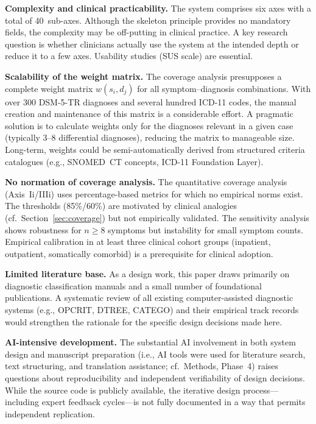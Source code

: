 \documentclass[11pt,a4paper]{article}
\begin{document}
\textbf{Complexity and clinical practicability.} The system comprises six axes with a total of 40~sub-axes. Although the skeleton principle provides no mandatory fields, the complexity may be off-putting in clinical practice. A key research question is whether clinicians actually use the system at the intended depth or reduce it to a few axes. Usability studies (SUS scale) are essential.

\textbf{Scalability of the weight matrix.} The coverage analysis presupposes a complete weight matrix $w(s_i, d_j)$ for all symptom--diagnosis combinations. With over 300 DSM-5-TR diagnoses and several hundred ICD-11 codes, the manual creation and maintenance of this matrix is a considerable effort. A pragmatic solution is to calculate weights only for the diagnoses relevant in a given case (typically 3--8 differential diagnoses), reducing the matrix to manageable size. Long-term, weights could be semi-automatically derived from structured criteria catalogues (e.g., SNOMED~CT concepts, ICD-11 Foundation Layer).

\textbf{No normation of coverage analysis.} The quantitative coverage analysis (Axis~Ii/IIIi) uses percentage-based metrics for which no empirical norms exist. The thresholds (85\%/60\%) are motivated by clinical analogies (cf.\ Section~\ref{sec:coverage}) but not empirically validated. The sensitivity analysis shows robustness for $n \geq 8$ symptoms but instability for small symptom counts. Empirical calibration in at least three clinical cohort groups (inpatient, outpatient, somatically comorbid) is a prerequisite for clinical adoption.

\textbf{Limited literature base.} As a design work, this paper draws primarily on diagnostic classification manuals and a small number of foundational publications. A systematic review of all existing computer-assisted diagnostic systems (e.g., OPCRIT, DTREE, CATEGO) and their empirical track records would strengthen the rationale for the specific design decisions made here.

\textbf{AI-intensive development.} The substantial AI involvement in both system design and manuscript preparation (i.e., AI tools were used for literature search, text structuring, and translation assistance; cf.\ Methods, Phase~4) raises questions about reproducibility and independent verifiability of design decisions. While the source code is publicly available, the iterative design process---including expert feedback cycles---is not fully documented in a way that permits independent replication.
\end{document}
